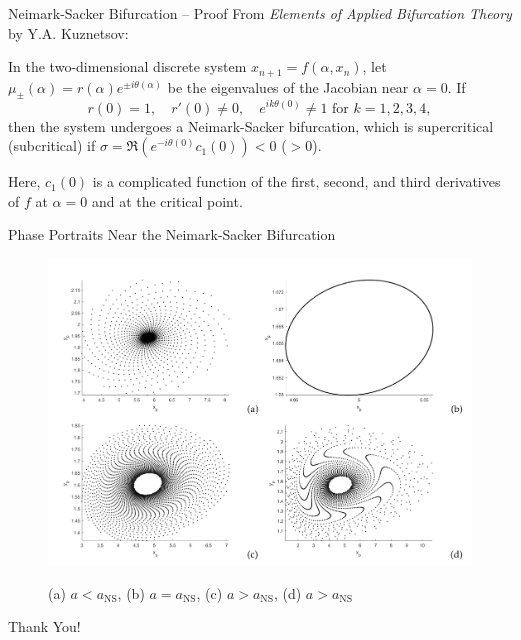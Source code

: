 \documentclass[]{beamer}
\begin{document}
	\begin{frame}{Neimark-Sacker Bifurcation -- Proof}
		From \textit{Elements of Applied Bifurcation Theory} by Y.A. Kuznetsov:
		\vfill
		\begin{block}{}
			In the two-dimensional discrete system $x_{n+1} = f(\alpha, x_n)$, let $\mu_{\pm}(\alpha) = r(\alpha)e^{\pm i\theta(\alpha)}$ be the eigenvalues of the Jacobian near $\alpha = 0$. If
			\begin{equation*}
				r(0) = 1, \quad r'(0) \ne 0, \quad e^{ik\theta(0)} \ne 1 \text{ for } k =1,2,3,4,
			\end{equation*}
			then the system undergoes a Neimark-Sacker bifurcation, which is supercritical (subcritical) if $\sigma = \Re\left(e^{-i\theta(0)}c_1(0)\right) < 0$ ($>0$).
		\end{block}
		\vfill
		
		Here, $c_1(0)$ is a complicated function of the first, second, and third derivatives of $f$ at $\alpha = 0$ and at the critical point.
	\end{frame}
	
	\begin{frame}{Phase Portraits Near the Neimark-Sacker Bifurcation}
		\begin{figure}
			\centering
			\includegraphics[width=\textwidth]{ns.png}
			
			(a) $a < a_{\text{NS}}$, (b) $a = a_{\text{NS}}$, (c) $a > a_{\text{NS}}$, (d) $a > a_{\text{NS}}$
		\end{figure}
	\end{frame}
	
	\begin{frame}{}
		\centering
		Thank You!
	\end{frame}
\end{document}
